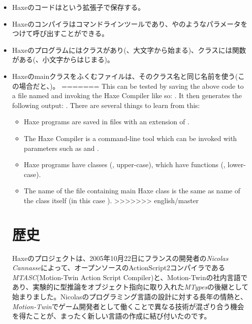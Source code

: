 \begin{itemize}
	\item Haxeのコードはという拡張子で保存する。
	\item Haxeのコンパイラはコマンドラインツールであり、やのようなパラメータをつけて呼び出すことができる。
	\item Haxeのプログラムにはクラスがあり(、大文字から始まる)、クラスには関数がある(、小文字からはじまる)。 
	\item Haxeのmainクラスをふくむファイルは、そのクラス名と同じ名前を使う(この場合だと、)。
=======
This can be tested by saving the above code to a file named  and invoking the Haxe Compiler like so: . It then generates the following output: . There are several things to learn from this:

\begin{itemize}
	\item Haxe programs are saved in files with an extension of .
	\item The Haxe Compiler is a command-line tool which can be invoked with parameters such as  and .
	\item Haxe programs have classes (, upper-case), which have functions (, lower-case). 
	\item The name of the file containing main Haxe class is the same as name of the class itself (in this case ). 
>>>>>>> english/master
\end{itemize}

\section{歴史}
\label{introduction-haxe-history}

Haxeのプロジェクトは、2005年10月22日にフランスの開発者の\emph{Nicolas Cannasse}によって、オープンソースのActionScript2コンパイラである\emph{MTASC}(Motion-Twin Action Script Compiler)と、Motion-Twinの社内言語であり、実験的に型推論をオブジェクト指向に取り入れた\emph{MTypes}の後継として始まりました。Nicolasのプログラミング言語の設計に対する長年の情熱と、\emph{Motion-Twin}でゲーム開発者として働くことで異なる技術が混ざり合う機会を得たことが、まったく新しい言語の作成に結び付いたのです。


\end{itemize}
